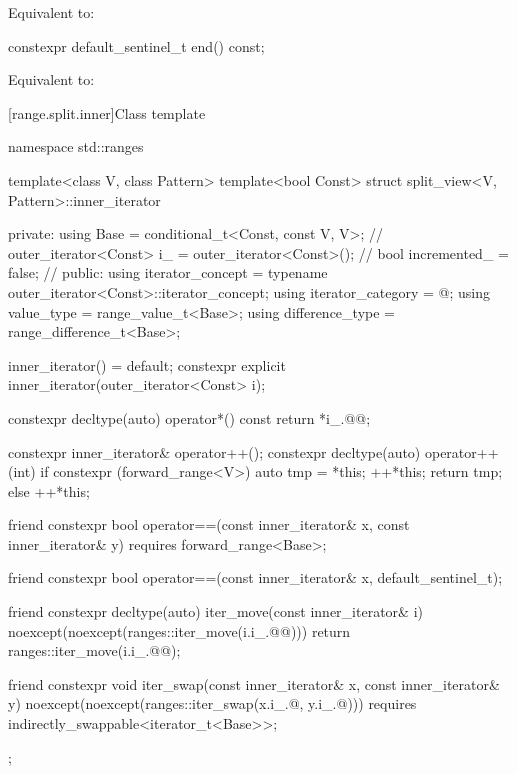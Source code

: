 \begin{itemdescr}
\pnum
\effects
Equivalent to: 
\end{itemdescr}

%
\begin{itemdecl}
constexpr default_sentinel_t end() const;
\end{itemdecl}

\begin{itemdescr}
\pnum
\effects
Equivalent to: 
\end{itemdescr}

[range.split.inner]{Class template }

%
\begin{codeblock}
namespace std::ranges {
  template<class V, class Pattern>
  template<bool Const>
  struct split_view<V, Pattern>::inner_iterator {
  private:
    using Base =
      conditional_t<Const, const V, V>;                 // \expos
    outer_iterator<Const> i_ = outer_iterator<Const>(); // \expos
    bool incremented_ = false;                          // \expos
  public:
    using iterator_concept  = typename outer_iterator<Const>::iterator_concept;
    using iterator_category = @\seebelow@;
    using value_type        = range_value_t<Base>;
    using difference_type   = range_difference_t<Base>;

    inner_iterator() = default;
    constexpr explicit inner_iterator(outer_iterator<Const> i);

    constexpr decltype(auto) operator*() const { return *i_.@@; }

    constexpr inner_iterator& operator++();
    constexpr decltype(auto) operator++(int) {
      if constexpr (forward_range<V>) {
        auto tmp = *this;
        ++*this;
        return tmp;
      } else
        ++*this;
    }

    friend constexpr bool operator==(const inner_iterator& x, const inner_iterator& y)
      requires forward_range<Base>;

    friend constexpr bool operator==(const inner_iterator& x, default_sentinel_t);

    friend constexpr decltype(auto) iter_move(const inner_iterator& i)
    noexcept(noexcept(ranges::iter_move(i.i_.@@))) {
      return ranges::iter_move(i.i_.@@);
    }

    friend constexpr void iter_swap(const inner_iterator& x, const inner_iterator& y)
      noexcept(noexcept(ranges::iter_swap(x.i_.@, y.i_.@)))
      requires indirectly_swappable<iterator_t<Base>>;
  };
}
\end{codeblock}

